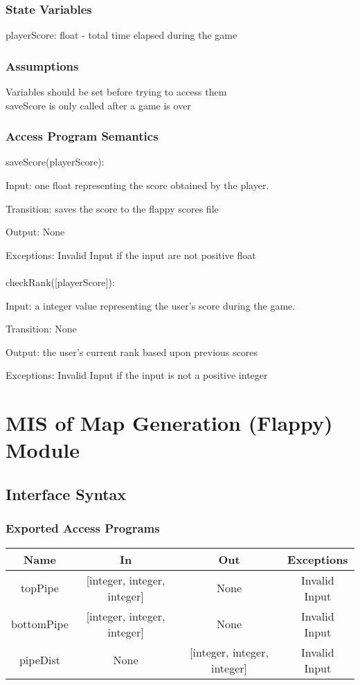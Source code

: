 \documentclass[12pt, titlepage]{article}
\begin{document}
		\subsubsection{State Variables}
		playerScore: float - total time elapsed during the game \\
		
		\subsubsection{Assumptions}
		Variables should be set before trying to access them \\
		saveScore is only called after a game is over
		
		\subsubsection{Access Program Semantics}
		saveScore(playerScore):
		
		Input: one float representing the score obtained by the player. 
		
		Transition: saves the score to the flappy scores file
		
		Output: None
		
		Exceptions: Invalid Input if the input are not positive float \\
		\\
		checkRank([playerScore]):
		
		Input: a integer value representing the user's score during the game.
		
		Transition: None
		
		Output: the user's current rank based upon previous scores
		
		Exceptions: Invalid Input if the input is not a positive integer
		
\section{MIS of Map Generation (Flappy) Module}
		\subsection{Interface Syntax}
		\subsubsection{Exported Access Programs}
		\begin{tabular}[pos]{|c|c|c|c|}
			\hline
			\textbf{Name}& \textbf{In} & \textbf{Out} & \textbf{Exceptions} \\ \hline
			topPipe & [integer, integer, integer] & None & Invalid Input \\ \hline
			bottomPipe & [integer, integer, integer] & None & Invalid Input \\ \hline
			pipeDist & None & [integer, integer, integer] & Invalid Input \\ \hline
			
		\end{tabular}
		
\end{document}
